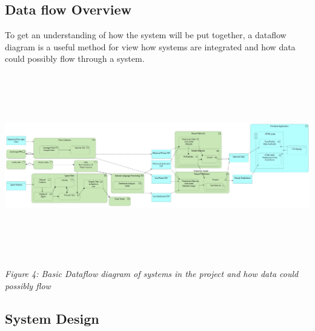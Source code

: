 \documentclass[oneside, 10pt]{article}
\begin{document}
			
		
		\subsection{Data flow Overview}\label{data-flow}
		To get an understanding of how the system will be put together, a dataflow diagram is a useful method for view how systems are integrated and how data could possibly flow through a system.
		
		\includegraphics[width=18cm,height=8cm]{images/Generic_Flow.png}
		\begin{center}
			\textit{Figure 4: Basic Dataflow diagram of systems in the project and how data could possibly flow}
		\end{center}
		
	\newpage
	
	\begin{center}	
		\section{System Design}\label{Design}
	\end{center}
\end{document}

